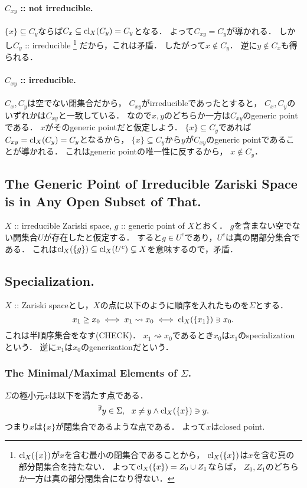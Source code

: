 \documentclass[a4paper]{jsarticle}
\begin{document}
    \paragraph{$C_{xy}$ :: not irreducible.}
    $\{x\} \subseteq C_y$ならば$C_x \subseteq \operatorname{cl}_X(C_y)=C_y$となる．
    よって$C_{xy}=C_y$が導かれる．
    しかし$C_y$ :: irreducible
    \footnote
    {
        $\operatorname{cl}_X(\{x\})$が$x$を含む最小の閉集合であることから，
        $\operatorname{cl}_X(\{x\})$は$x$を含む真の部分閉集合を持たない．
        よって$\operatorname{cl}_X(\{x\})=Z_0 \cup Z_1$ならば，
        $Z_0, Z_1$のどちらか一方は真の部分閉集合になり得ない．
    }
    だから，これは矛盾．
    したがって$x \not \in C_y$．
    逆に$y \not \in C_x$も得られる．

    \paragraph{$C_{xy}$ :: irreducible.}
    $C_x,C_y$は空でない閉集合だから，
    $C_{xy}$がirreducibleであったとすると，
    $C_x, C_y$のいずれかは$C_{xy}$と一致している．
    なので$x,y$のどちらか一方は$C_{xy}$のgeneric pointである．
    $x$がそのgeneric pointだと仮定しよう．
    $\{x\} \subseteq C_y$であれば$C_{xy}=\operatorname{cl}_X(C_y)=C_y$となるから，
    $\{x\} \subseteq C_y$から$y$が$C_{xy}$のgeneric pointであることが導かれる．
    これはgeneric pointの唯一性に反するから，
    $x \not \in C_y$．

    \subsection{The Generic Point of Irreducible Zariski Space is in Any Open Subset of That.}
    $X$ :: irreducible Zariski space, $g$ :: generic point of $X$とおく．
    $g$を含まない空でない開集合$U$が存在したと仮定する．
    すると$g \in U^c$であり，$U^c$は真の閉部分集合である．
    これは$\operatorname{cl}_X(\{g\}) \subseteq \operatorname{cl}_X(U^c) \subsetneq X$を意味するので，矛盾．

    \subsection{Specialization.}
    $X$ :: Zariski spaceとし，$X$の点に以下のように順序を入れたものを$\Sigma$とする．
    \[ x_1 \geq x_0 \iff x_1 \rightsquigarrow x_0 \iff \operatorname{cl}_X(\{x_1\}) \ni x_0. \]
    これは半順序集合をなす(CHECK)．
    $x_1 \rightsquigarrow x_0$であるとき$x_0$は$x_1$のspecializationという．
    逆に$x_1$は$x_0$のgenerizationだという．

    \subsubsection{The Minimal/Maximal Elements of $\Sigma$.}
    $\Sigma$の極小元$x$は以下を満たす点である．
    \[ {}^{\not \exists} y \in \Sigma,~~ x \neq y \land \operatorname{cl}_X(\{x\}) \ni y. \]
    つまり$x$は$\{x\}$が閉集合であるような点である．
    よって$x$はclosed point.
\end{document}
